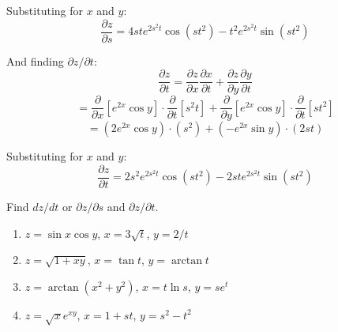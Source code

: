 Substituting for $x$ and $y$:
$$\frac{\partial z}{\partial s} = 4ste^{2s^2t}\cos{ \left( st^2 \right)} - 
t^2e^{2s^2t} \sin{ \left( st^2 \right)}$$

And finding $\partial z / \partial t$:
$$\frac{\partial z}{\partial t} = \frac{\partial z}{\partial x} \frac{\partial 
x}{\partial t} + \frac{\partial z}{\partial y} \frac{\partial y}{\partial t}$$
$$= \frac{\partial}{\partial x} \left[ e^{2x} \cos{y} \right] \cdot \frac{
\partial}{\partial t} \left[ s^2 t \right] + \frac{\partial}{\partial y} 
\left[ e^{2x} \cos{y} \right] \cdot \frac{\partial}{\partial t} \left[ st^2 
\right]$$
$$= \left( 2e^{2x} \cos{y} \right) \cdot \left( s^2 \right) + \left( -e^{2x}
\sin{y} \right) \cdot \left( 2st \right)$$

Substituting for $x$ and $y$:
$$\frac{\partial z}{\partial t} = 2s^2e^{2s^2t} \cos{ \left(st^2 \right)} - 
2ste^{2s^2t}\sin{\left( st^2 \right)}$$

\begin{Exercise}[title = {The Chain Rule for Multivariable Functions}, 
label = chain]
Find $dz/dt$ or $\partial z / \partial s$ and $\partial z / \partial t$. 
\begin{enumerate}
    \item $z = \sin{x}\cos{y}$, $x = 3\sqrt{t}$, $y = 2/t$
    \item $z = \sqrt{1 + xy}$, $x = \tan{t}$, $y = \arctan{t}$
    \item $z = \arctan{\left( x^2 + y^2 \right)}$, $x = t\ln{s}$, $y = se^{t}$
    \item $z = \sqrt{x}e^{xy}$, $x = 1 + st$, $y = s^2 - t^2$
\end{enumerate}
\vspace{75mm}
\end{Exercise}

